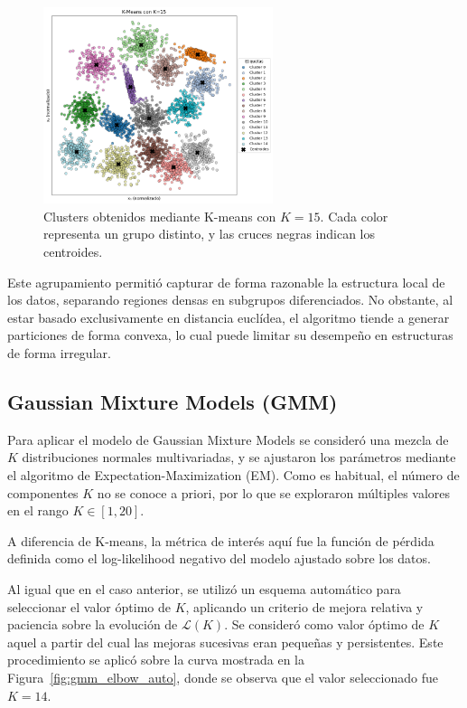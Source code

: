 \documentclass[11pt]{article}
\begin{document}
\begin{figure}[h]
    \centering
    \includegraphics[width=0.6\textwidth]{figures/kmeans_clusters_k15.png}
    \caption{Clusters obtenidos mediante K-means con $K = 15$. Cada color representa un grupo distinto, y las cruces negras indican los centroides.}
    \label{fig:kmeans_clusters_15}
\end{figure}

Este agrupamiento permitió capturar de forma razonable la estructura local de los datos, separando regiones densas en subgrupos diferenciados. No obstante, al estar basado exclusivamente en distancia euclídea, el algoritmo tiende a generar particiones de forma convexa, lo cual puede limitar su desempeño en estructuras de forma irregular.

\subsection*{Gaussian Mixture Models (GMM)}

Para aplicar el modelo de Gaussian Mixture Models se consideró una mezcla de $K$ distribuciones normales multivariadas, y se ajustaron los parámetros mediante el algoritmo de Expectation-Maximization (EM). Como es habitual, el número de componentes $K$ no se conoce a priori, por lo que se exploraron múltiples valores en el rango $K \in [1, 20]$.

A diferencia de K-means, la métrica de interés aquí fue la función de pérdida definida como el log-likelihood negativo del modelo ajustado sobre los datos.

Al igual que en el caso anterior, se utilizó un esquema automático para seleccionar el valor óptimo de $K$, aplicando un criterio de mejora relativa y paciencia sobre la evolución de $\mathcal{L}(K)$. Se consideró como valor óptimo de $K$ aquel a partir del cual las mejoras sucesivas eran pequeñas y persistentes. Este procedimiento se aplicó sobre la curva mostrada en la Figura~\ref{fig:gmm_elbow_auto}, donde se observa que el valor seleccionado fue $K = 14$.
\end{document}
